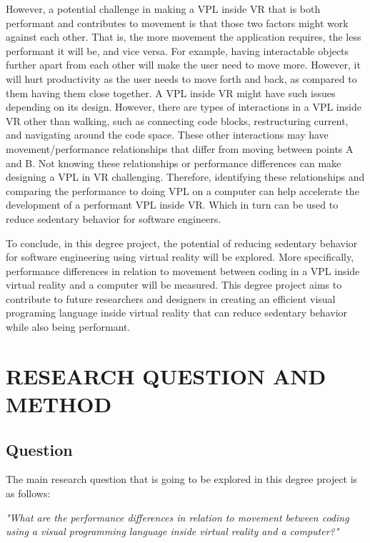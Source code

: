 \documentclass{sigchi}
\begin{document}
However, a potential challenge in making a VPL inside VR that is both performant and contributes to movement is that those two factors might work against each other. That is, the more movement the application requires, the less performant it will be, and vice versa. For example, having interactable objects further apart from each other will make the user need to move more. However, it will hurt productivity as the user needs to move forth and back, as compared to them having them close together. A VPL inside VR might have such issues depending on its design. However, there are types of interactions in a VPL inside VR other than walking, such as connecting code blocks, restructuring current, and navigating around the code space. These other interactions may have movement/performance relationships that differ from moving between points A and B. Not knowing these relationships or performance differences can make designing a VPL in VR challenging. Therefore, identifying these relationships and comparing the performance to doing VPL on a computer can help accelerate the development of a performant VPL inside VR. Which in turn can be used to reduce sedentary behavior for software engineers.

To conclude, in this degree project, the potential of reducing sedentary behavior for software engineering using virtual reality will be explored. More specifically, performance differences in relation to movement between coding in a VPL inside virtual reality and a computer will be measured. This degree project aims to contribute to future researchers and designers in creating an efficient visual programing language inside virtual reality that can reduce sedentary behavior while also being performant.

\section{RESEARCH QUESTION AND METHOD}

\subsection{Question}
The main research question that is going to be explored in this degree project is as follows:

\textit{
  "What are the performance differences in relation to movement between coding using a visual programming language inside virtual reality and a computer?"
}
\end{document}

